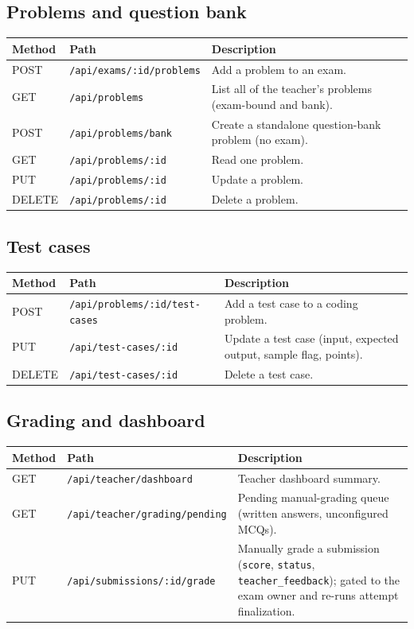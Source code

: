 \subsection{Problems and question bank}

\begin{xltabular}{\linewidth}{l >{\ttfamily\small\raggedright\arraybackslash}p{5.7cm} X}
  \toprule
  Method & Path & Description \\
  \midrule
  POST   & \texttt{/api/exams/:id/problems} & Add a problem to an exam. \\
  GET    & \texttt{/api/problems}           & List all of the teacher's problems (exam-bound and bank). \\
  POST   & \texttt{/api/problems/bank}      & Create a standalone question-bank problem (no exam). \\
  GET    & \texttt{/api/problems/:id}       & Read one problem. \\
  PUT    & \texttt{/api/problems/:id}       & Update a problem. \\
  DELETE & \texttt{/api/problems/:id}       & Delete a problem. \\
  \bottomrule
\end{xltabular}

\subsection{Test cases}

\begin{xltabular}{\linewidth}{l >{\ttfamily\small\raggedright\arraybackslash}p{5.7cm} X}
  \toprule
  Method & Path & Description \\
  \midrule
  POST   & \texttt{/api/problems/:id/test-cases} & Add a test case to a coding problem. \\
  PUT    & \texttt{/api/test-cases/:id}          & Update a test case (input, expected output, sample flag, points). \\
  DELETE & \texttt{/api/test-cases/:id}          & Delete a test case. \\
  \bottomrule
\end{xltabular}

\subsection{Grading and dashboard}

\begin{xltabular}{\linewidth}{l >{\ttfamily\small\raggedright\arraybackslash}p{5.7cm} X}
  \toprule
  Method & Path & Description \\
  \midrule
  GET & \texttt{/api/teacher/dashboard}        & Teacher dashboard summary. \\
  GET & \texttt{/api/teacher/grading/pending}  & Pending manual-grading queue (written answers, unconfigured MCQs). \\
  PUT & \texttt{/api/submissions/:id/grade}    & Manually grade a submission (\texttt{score}, \texttt{status}, \texttt{teacher\_feedback}); gated to the exam owner and re-runs attempt finalization. \\
  \bottomrule
\end{xltabular}

